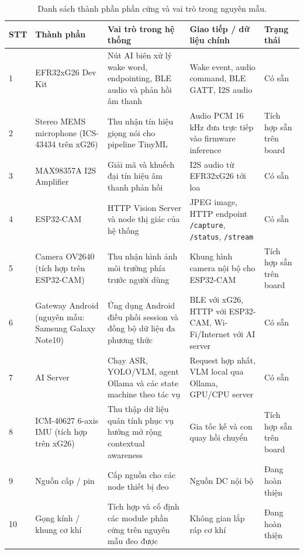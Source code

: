 \documentclass[11pt,a4paper]{article}
\begin{document}
\begin{table}[H]
\centering
\caption{Danh sách thành phần phần cứng và vai trò trong nguyên mẫu.}
\begin{tabularx}{\textwidth}{p{0.7cm}p{3.2cm}p{4.4cm}p{3.2cm}Y}
\toprule
\textbf{STT} & \textbf{Thành phần} & \textbf{Vai trò trong hệ thống} & \textbf{Giao tiếp / dữ liệu chính} & \textbf{Trạng thái} \\
\midrule

1 &
EFR32xG26 Dev Kit &
Nút AI biên xử lý wake word, endpointing, BLE audio và phản hồi âm thanh &
Wake event, audio command, BLE GATT, I2S audio &
Có sẵn \\

2 &
Stereo MEMS microphone
(ICS-43434 trên xG26) &
Thu nhận tín hiệu giọng nói cho pipeline TinyML &
Audio PCM 16 kHz đưa trực tiếp vào firmware inference &
Tích hợp sẵn trên board \\

3 &
MAX98357A I2S Amplifier &
Giải mã và khuếch đại tín hiệu âm thanh phản hồi &
I2S audio từ EFR32xG26 tới loa &
Có sẵn \\

4 &
ESP32-CAM &
HTTP Vision Server và node thị giác của hệ thống &
JPEG image, HTTP endpoint \texttt{/capture}, \texttt{/status}, \texttt{/stream} &
Có sẵn \\

5 &
Camera OV2640
(tích hợp trên ESP32-CAM) &
Thu nhận hình ảnh môi trường phía trước người dùng &
Khung hình camera nội bộ cho ESP32-CAM &
Tích hợp sẵn trên board \\

6 &
Gateway Android
(nguyên mẫu: Samsung Galaxy Note10) &
Ứng dụng Android điều phối session và đồng bộ dữ liệu đa phương thức &
BLE với xG26, HTTP với ESP32-CAM, Wi-Fi/Internet với AI server &
Có sẵn \\

7 &
AI Server &
Chạy ASR, YOLO/VLM, agent Ollama và các state machine theo tác vụ &
Request hợp nhất, VLM local qua Ollama, GPU/CPU server &
Có sẵn \\

8 &
ICM-40627 6-axis IMU
(tích hợp trên xG26) &
Thu thập dữ liệu quán tính phục vụ hướng mở rộng contextual awareness &
Gia tốc kế và con quay hồi chuyển &
Tích hợp sẵn trên board \\

9 &
Nguồn cấp / pin &
Cấp nguồn cho các node thiết bị đeo &
Nguồn DC nội bộ &
Đang hoàn thiện \\

10 &
Gọng kính / khung cơ khí &
Tích hợp và cố định các module phần cứng trên nguyên mẫu đeo được &
Không gian lắp ráp cơ khí &
Đang hoàn thiện \\

\bottomrule
\end{tabularx}
\end{table}
\end{document}
